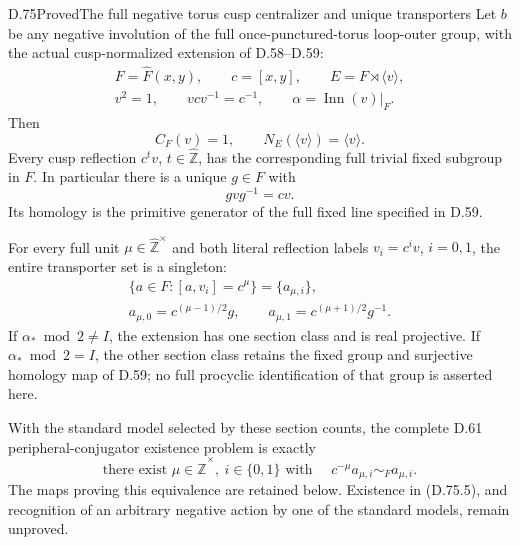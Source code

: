 \begin{claim}{D.75}{Proved}{The full negative torus cusp centralizer and unique transporters}
Let $b$ be any negative involution of the full
once-punctured-torus loop-outer group, with the actual
cusp-normalized extension of D.58--D.59:
\[
 \begin{gathered}
 F=\widehat F(x,y),\qquad c=[x,y],\qquad
 E=F\rtimes\langle v\rangle,\\
 v^2=1,\qquad vcv^{-1}=c^{-1},\qquad
 \alpha=\operatorname{Inn}(v)|_F .
 \end{gathered}                                             \tag{D.75.1}
\]
Then
\[
                    C_F(v)=1,\qquad N_E(\langle v\rangle)
                                      =\langle v\rangle .
                                                               \tag{D.75.2}
\]
Every cusp reflection $c^t v$, $t\in\widehat{\mathbb Z}$,
has the corresponding full trivial fixed subgroup in $F$.
In particular there is a unique $g\in F$ with
\[
                            gvg^{-1}=cv .                   \tag{D.75.3}
\]
Its homology is the primitive generator of the full fixed
line specified in D.59.

For every full unit $\mu\in\widehat{\mathbb Z}^{\times}$
and both literal reflection labels $v_i=c^i v$, $i=0,1$,
the entire transporter set is a singleton:
\[
 \begin{gathered}
 \{a\in F:[a,v_i]=c^\mu\}=\{a_{\mu,i}\},\\
 a_{\mu,0}=c^{(\mu-1)/2}g,\qquad
 a_{\mu,1}=c^{(\mu+1)/2}g^{-1}.
 \end{gathered}                                             \tag{D.75.4}
\]
If $\alpha_*\bmod2\ne I$, the extension has one section
class and is real projective.  If $\alpha_*\bmod2=I$,
the other section class retains the fixed group and
surjective homology map of D.59; no full procyclic
identification of that group is asserted here.

With the standard model selected by these section counts,
the complete D.61 peripheral-conjugator existence problem
is exactly
\[
 \text{there exist }\mu\in\widehat{\mathbb Z}^{\times},
 \ i\in\{0,1\}\text{ with }\quad
                     c^{-\mu}a_{\mu,i}\sim_F a_{\mu,i}.
                                                               \tag{D.75.5}
\]
The maps proving this equivalence are retained below.
Existence in (D.75.5), and recognition of an arbitrary
negative action by one of the standard models, remain
unproved.
\end{claim}
